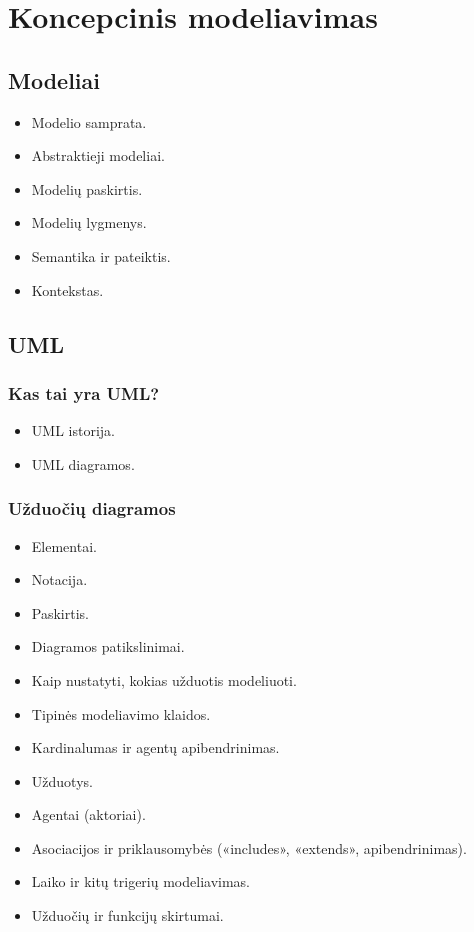 \section{Koncepcinis modeliavimas}

\subsection{Modeliai}

\begin{itemize}
  \item Modelio samprata.
  \item Abstraktieji modeliai.
  \item Modelių paskirtis.
  \item Modelių lygmenys.
  \item Semantika ir pateiktis.
  \item Kontekstas.
\end{itemize}

\subsection{UML}

\subsubsection{Kas tai yra UML?}

\begin{itemize}
  \item UML istorija.
  \item UML diagramos.
\end{itemize}

\subsubsection{Užduočių diagramos}

\begin{itemize}
  \item Elementai.
  \item Notacija.
  \item Paskirtis.
  \item Diagramos patikslinimai.
  \item Kaip nustatyti, kokias užduotis modeliuoti.
  \item Tipinės modeliavimo klaidos.
  \item Kardinalumas ir agentų apibendrinimas.
  \item Užduotys.
  \item Agentai (aktoriai).
  \item Asociacijos ir priklausomybės («includes», «extends», 
    apibendrinimas).
  \item Laiko ir kitų trigerių modeliavimas.
  \item Užduočių ir funkcijų skirtumai.
\end{itemize}

